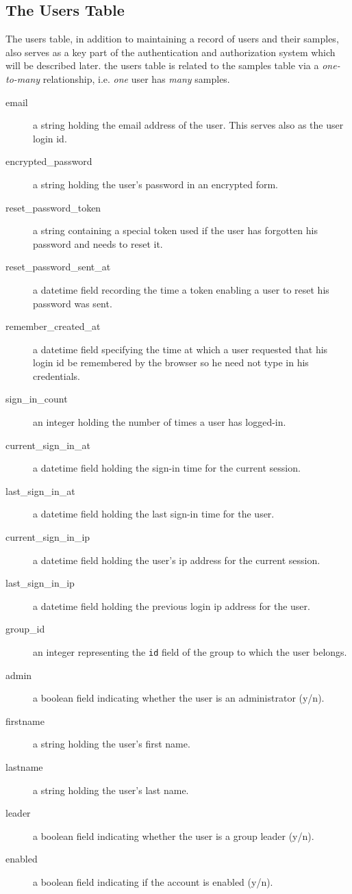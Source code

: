 \documentclass[12pt,twoside]{article}
\begin{document}
\subsection{The Users Table}
The users table, in addition to maintaining a record of users and their
samples, also serves as a key part of the authentication and authorization
system which will be described later. the users table is related to the
samples table via a \emph{one-to-many} relationship, i.e. \emph{one} user
has \emph{many} samples.
\begin{description}
\item[email]
a string holding the email address of the user. This serves also as the
user login id.
\item[encrypted\_password]
a string holding the user's password in an encrypted form.
\item[reset\_password\_token]
a string containing a special token used if the user has forgotten his
password and needs to reset it.
\item[reset\_password\_sent\_at]
a datetime field recording the time a token enabling a user to reset his
password was sent.
\item[remember\_created\_at]
a datetime field specifying the time at which a user requested that his
login id be remembered by the browser so he need not type in his credentials.
\item[sign\_in\_count]
an integer holding the number of times a user has logged-in.
\item[current\_sign\_in\_at]
a datetime field holding the sign-in time for the current session.
\item[last\_sign\_in\_at]
a datetime field holding the last sign-in time for the user.
\item[current\_sign\_in\_ip]
a datetime field holding the user's ip address for the current session.
\item[last\_sign\_in\_ip]
a datetime field holding the previous login ip address for the user.
\item[group\_id]
an integer representing the \verb=id= field of the group to which
the user belongs.
\item[admin]
a boolean field indicating whether the user is an administrator (y/n).
\item[firstname]
a string holding the user's first name.
\item[lastname]
a string holding the user's last name.
\item[leader]
a boolean field indicating whether the user is a group leader (y/n).
\item[enabled]
a boolean field indicating if the account is enabled (y/n).

\end{description}
\end{document}
